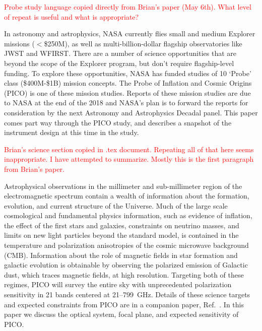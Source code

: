 \documentclass[]{spie}  %
\newcommand{\comr}[1]{\textcolor{red}{#1}}
\begin{document}
\comr{Probe study language copied directly from Brian's paper (May 6th).  What level of repeat is useful and what is appropriate?}

In astronomy and astrophysics, NASA currently flies small and medium Explorer missions ($<$\$250M), as well as multi-billion-dollar flagship observatories like JWST and WFIRST. There are a number of science opportunities that are beyond the scope of the Explorer program, but don't require flagship-level funding. To explore these opportunities, NASA has funded studies of 10 `Probe' class (\$400M-\$1B) mission concepts. The Probe of Inflation and Cosmic Origins (PICO) is one of these mission studies. Reports of these mission studies are due to NASA at the end of the 2018 and NASA's plan is to forward the reports for consideration by the next Astronomy and Astrophysics Decadal panel. This paper comes part way through the PICO study, and describes a snapshot of the  instrument design at this time in the study.


\comr{Brian's science section copied in .tex document. Repeating all of that here seems inappropriate. I have attempted to summarize. Mostly this is the first paragraph from Brian's paper.}

Astrophysical observations in the  millimeter and sub-millimeter region of the electromagnetic spectrum contain a wealth of information about 
the formation, evolution, and current structure of the Universe.  Much of the large scale cosmological and fundamental physics information, such as 
evidence of inflation, the effect of the first stars and galaxies, constraints on neutrino masses, and limits on new light particles beyond 
the standard model, is contained in the temperature and polarization anisotropies of the cosmic microwave background (CMB).  Information 
about the role of magnetic fields in star formation and galactic evolution is obtainable by observing the polarized emission of Galactic dust, which 
traces magnetic fields, at high resolution. Targeting both of these regimes, PICO will survey the entire sky with unprecedented polarization sensitivity 
in 21 bands centered at 21--799~GHz.  Details of these science targets and expected constraints from PICO are in a companion paper, Ref.~. 
In this paper we discuss the optical system, focal plane, and expected sensitivity of PICO.

\end{document}
